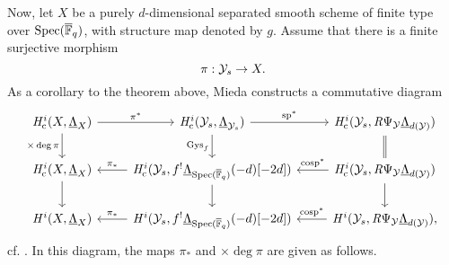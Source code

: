 \documentclass[../main.tex]{subfiles}
\begin{document}
Now, let $X$ be a purely $d$-dimensional separated smooth scheme of finite type
over $\operatorname{Spec}({\overline {\mathbb{F}}_q})$, with structure map denoted by $g$. Assume that there is a
finite surjective morphism
\begin{equation*}
  \pi: \mathcal{Y}_s \to X.
\end{equation*}
As a corollary to the theorem above, Mieda constructs a commutative diagram
\begin{equation}\label{eq:MiedasCommutingDiagram}
\begin{tikzcd}[ampersand replacement=\&]
  {\hHc^i(X, \underline \Lambda_X)} \& {\hHc^i(\cY_s, \underline
  \Lambda_{\cY_s})} \& {\hHc^i(\cY_s, \derR \Psi_\cY \underline
    \Lambda_{d(\cY)})} \\
  {\hHc^i(X, \underline \Lambda_{X})} \& {\hHc^i(\cY_s, f^! \underline
  \Lambda_{\spec(\Fqbar)}(-d)[-2d])} \& {\hHc^i(\cY_s, \derR \Psi_\cY
  \underline \Lambda_{d(\cY)})} \\
  {\hH^i(X, \underline \Lambda_{X})} \& {\hH^i(\cY_s, f^! \underline
  \Lambda_{\spec(\Fqbar)}(-d)[-2d])} \& {\hH^i(\cY_s, \derR \Psi_\cY \underline
  \Lambda_{d(\cY)}),}
	\arrow["{\pi^*}", from=1-1, to=1-2]
	\arrow["{\times \deg\pi}"', from=1-1, to=2-1]
	\arrow["{\specmap^*}", from=1-2, to=1-3]
	\arrow["{\Gys_f}"', from=1-2, to=2-2]
	\arrow[Rightarrow, no head, from=1-3, to=2-3]
	\arrow[from=2-1, to=3-1]
	\arrow["{\pi_*}"', from=2-2, to=2-1]
	\arrow[from=2-2, to=3-2]
	\arrow["{\cospecmap^*}"', from=2-3, to=2-2]
	\arrow[from=2-3, to=3-3]
	\arrow["{\pi_*}"', from=3-2, to=3-1]
	\arrow["{\cospecmap^*}"', from=3-3, to=3-2]
\end{tikzcd}
\end{equation}
cf. \cite[Corollary 2.7]{mieda2016geometric}.
In this diagram, the maps $\pi_*$ and $\times \deg \pi$ are given as follows.
\end{document}
